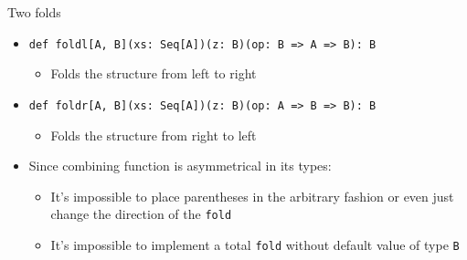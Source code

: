 \documentclass[presentation,aspectratio=169,smaller]{beamer}
\begin{document}
\begin{frame}[label={sec:orgccc8410},fragile]{Two folds}
 \begin{itemize}
\item \texttt{def foldl[A, B](xs: Seq[A])(z: B)(op: B => A => B): B}
\begin{itemize}
\item Folds the structure from left to right
\end{itemize}
\item \texttt{def foldr[A, B](xs: Seq[A])(z: B)(op: A => B => B): B}
\begin{itemize}
\item Folds the structure from right to left
\end{itemize}
\item Since combining function is asymmetrical in its types:
\begin{itemize}
\item It’s impossible to place parentheses in the arbitrary fashion or even just
change the direction of the \texttt{fold}
\item It’s impossible to implement a total \texttt{fold} without default value of type \texttt{B}
\end{itemize}
\end{itemize}
\end{frame}
\end{document}
